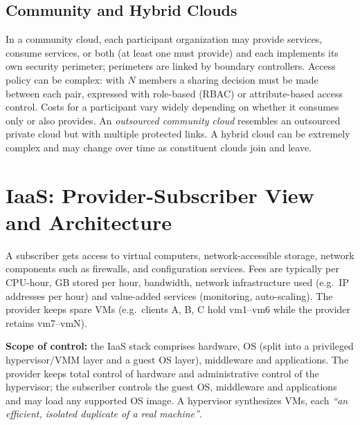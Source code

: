 \documentclass[11pt,a4paper,openany]{report}
\begin{document}
\subsection{Community and Hybrid Clouds}
In a community cloud, each participant organization may provide services, consume services, or both
(at least one must provide) and each implements its own security perimeter; perimeters are linked by
boundary controllers. Access policy can be complex: with $N$ members a sharing decision must be made
between each pair, expressed with role-based (RBAC) or attribute-based access control. Costs for a
participant vary widely depending on whether it consumes only or also provides. An \emph{outsourced
community cloud} resembles an outsourced private cloud but with multiple protected links.
A hybrid cloud can be extremely complex and may change over time as constituent clouds join and leave.

\section{IaaS: Provider-Subscriber View and Architecture}
A subscriber gets access to virtual computers, network-accessible storage, network components such as
firewalls, and configuration services. Fees are typically per CPU-hour, GB stored per hour, bandwidth,
network infrastructure used (e.g.\ IP addresses per hour) and value-added services (monitoring,
auto-scaling). The provider keeps spare VMs (e.g.\ clients A, B, C hold vm1--vm6 while the provider
retains vm7--vmN).

\textbf{Scope of control:} the IaaS stack comprises hardware, OS (split into a privileged hypervisor/VMM layer and
a guest OS layer), middleware and applications. The provider keeps total control of hardware and
administrative control of the hypervisor; the subscriber controls the guest OS, middleware and
applications and may load any supported OS image. A hypervisor synthesizes VMs, each \emph{``an efficient,
isolated duplicate of a real machine''}.
\end{document}
